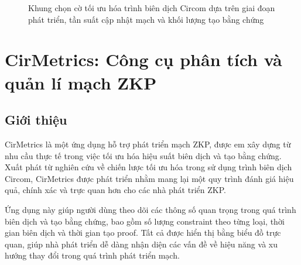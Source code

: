 \begin{figure}[h] %
    \centering %
    \caption{Khung chọn cờ tối ưu hóa trình biên dịch Circom dựa trên giai đoạn phát triển, tần suất cập nhật mạch và khối lượng tạo bằng chứng}
    \label{fig:chapter4-FrameworkCircom}
\end{figure}
\clearpage

\section{CirMetrics: Công cụ phân tích và quản lí mạch ZKP}
\subsection{Giới thiệu}
CirMetrics là một ứng dụng hỗ trợ phát triển mạch ZKP, được em xây dựng từ nhu cầu thực tế trong việc tối ưu hóa hiệu suất biên dịch và tạo bằng chứng. Xuất phát từ nghiên cứu về chiến lược tối ưu hóa trong sử dụng trình biên dịch Circom, CirMetrics được phát triển nhằm mang lại một quy trình đánh giá hiệu quả, chính xác và trực quan hơn cho các nhà phát triển ZKP.

Ứng dụng này giúp người dùng theo dõi các thông số quan trọng trong quá trình biên dịch và tạo bằng chứng, bao gồm số lượng constraint theo từng loại, thời gian biên dịch và thời gian tạo proof. Tất cả được hiển thị bằng biểu đồ trực quan, giúp nhà phát triển dễ dàng nhận diện các vấn đề về hiệu năng và xu hướng thay đổi trong quá trình phát triển mạch.

